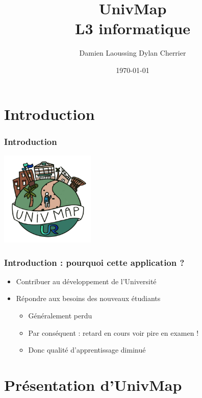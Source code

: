 \documentclass{beamer}
\title[Dev. Mobiles -- L3 info]{UnivMap\\L3 informatique}
\author{Damien Laoussing Dylan Cherrier}
\institute[DI]{Département d'informatique}
\date{\today}
\begin{document}
\begin{frame}
  \titlepage
\end{frame}


\section{Introduction}
%
%
\begin{frame}
  \frametitle{Introduction}
  \begin{center}
    \includegraphics[width=45mm, scale=0.5]{UnivMap-logo500x500.png}
  \end{center}
  
\end{frame}
%
%

\begin{frame}
  \frametitle{Introduction : pourquoi cette application ?}

  \begin{itemize}
    \item Contribuer au développement de l'Université
    \item Répondre aux besoins des nouveaux étudiants
    \begin{itemize}
      \item Généralement perdu
      \item Par conséquent : retard en cours voir pire en examen !
      \item Donc qualité d'apprentissage diminué
    \end{itemize}
  \end{itemize}
  
\end{frame}
%
%
\section{Présentation d'UnivMap}
%
%
\end{document}
